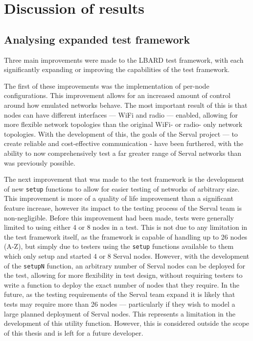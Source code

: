 
\chapter{Discussion of results} %

\label{Chapter7} %


\section{Analysing expanded test framework}
Three main improvements were made to the LBARD test framework, with each significantly expanding or improving the capabilities of the test framework.

The first of these improvements was the implementation of per-node configurations.
This improvement allows for an increased amount of control around how emulated networks behave.
The most important result of this is that nodes can have different interfaces — WiFi and radio — enabled, allowing for more flexible network topologies than the original WiFi- or radio- only network topologies.
With the development of this, the goals of the Serval project — to create reliable and cost-effective communication - have been furthered, with the ability to now comprehensively test a far greater range of Serval networks than was previously possible.

The next improvement that was made to the test framework is the development of new \texttt{setup} functions to allow for easier testing of networks of arbitrary size.
This improvement is more of a quality of life improvement than a significant feature increase, however its impact to the testing process of the Serval team is non-negligible.
Before this improvement had been made, tests were generally limited to using either 4 or 8 nodes in a test. 
This is not due to any limitation in the test framework itself, as the framework is capable of handling up to 26 nodes (A-Z), but simply due to testers using the \texttt{setup} functions available to them which only setup and started 4 or 8 Serval nodes.
However, with the development of the \texttt{setupN} function, an arbitrary number of Serval nodes can be deployed for the test, allowing for more flexibility in test design, without requiring testers to write a function to deploy the exact number of nodes that they require.
In the future, as the testing requirements of the Serval team expand it is likely that tests may require more than 26 nodes — particularly if they wish to model a large planned deployment of Serval nodes.
This represents a limitation in the development of this utility function.
However, this is considered outside the scope of this thesis and is left for a future developer.

